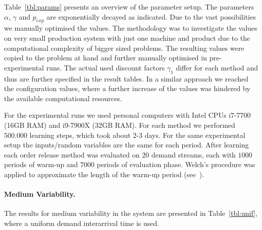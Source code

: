 \documentclass[envcountsame]{llncs}
\begin{document}
%
Table~\ref{tbl:params} presents an overview of the parameter setup. The parameters \(\alpha\),
\(\gamma\) and \(p_{exp}\) are exponentially decayed as indicated. Due to the vast possibilities we
manually optimised the values. The methodology was to investigate the values on very small
production system with just one machine and product due to the computational complexity of bigger
sized problems. The resulting values were copied to the problem at hand and further manually
optimised in pre-experimental runs. The actual used discount factors \(\gamma_{1}\) differ for each
method and thus are further specified in the result tables.
In a similar approach we reached the configuration values, where a further increase of the values
was hindered by the available computational resources.


For the experimental runs we used personal computers with Intel CPUs i7-7700 (16GB RAM) and i9-7900X
(32GB RAM). For each method we performed \(500.000\) learning steps, which took about \(2\)-\(3\)
days. For the same experimental setup the inputs/random variables are the same for each period.
After learning each order release method was evaluated on \(20\) demand streams, each with \(1000\)
periods of warm-up and \(7000\) periods of evaluation phase. Welch’s procedure was applied to
approximate the length of the warm-up period (see~\cite{law:simulationc}).

\paragraph{Medium Variability.} The results for medium variability in the system are presented in
Table~\ref{tbl:unif}, where a uniform demand interarrival time is used.


\end{document}
